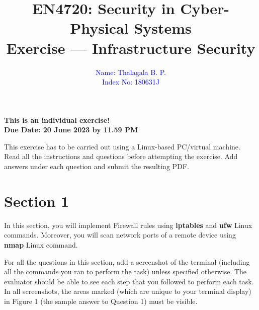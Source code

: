 \documentclass[11pt,letterpaper]{article}
\begin{document}
	
	\title{EN4720: Security in Cyber-Physical Systems \\ Exercise --- Infrastructure Security}
	
	\author{ \textcolor{blue}{Name: Thalagala B. P.} \\ \textcolor{blue}{Index No: 180631J}}
	
	\maketitle
	
	\begin{center}
		\color{red}\bf This is an individual exercise! \\ Due Date: 20 June 2023 by 11.59 PM
	\end{center}
	
	
	\vspace{1in}
	
	This exercise has to be carried out using a Linux-based PC/virtual machine. Read all the instructions and questions before attempting the exercise. Add answers under each question and submit the resulting PDF.
	
	
	\newpage
	\section*{Section 1}
	
	In this section, you will implement Firewall rules using \textbf{iptables} and \textbf{ufw} Linux commands. Moreover, you will scan network ports of a remote device using \textbf{nmap} Linux command.  
	
	For all the questions in this section, add a screenshot of the terminal (including all the commands you ran to perform the task) unless specified otherwise. The evaluator should be able to see each step that you followed to perform each task. In all screenshots, the areas marked (which are unique to your terminal display) in Figure 1 (the sample answer to Question 1) must be visible.
	
\end{document}
